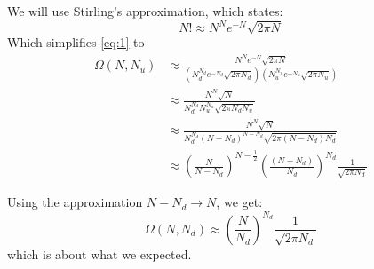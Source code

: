 \documentclass[paper=a4, fontsize=11pt]{scrartcl} %
\numberwithin{equation}{section} %
\numberwithin{figure}{section} %
\numberwithin{table}{section} %
\begin{document}
We will use Stirling's approximation, which states:
\[
    N! \approx N^Ne^{-N}\sqrt{2\pi N}
\]
Which simplifies \ref{eq:1} to
\begin{equation}
    \begin{aligned}
        \Omega(N, N_u) &\approx \frac{N^Ne^{-N}\sqrt{2\pi N}}
                                {(N_d^{N_d}e^{-N_d}\sqrt{2\pi N_d})(N_u^{N_u}e^{-N_u}\sqrt{2\pi N_u})}\\
                        &\approx \frac{N^N\sqrt{N}}{N_d^{N_d}N_u^{N_u}\sqrt{2\pi N_dN_u}}\\
                        &\approx \frac{N^N\sqrt{N}}{N_d^{N_d}(N-N_d)^{N-N_d}\sqrt{2\pi (N - N_d)N_d}}\\
                        &\approx \left (\frac{N}{N-N_d}\right )^{N-\frac{1}{2}} \left(\frac{(N-N_d)}{N_d}\right)^{N_d}\frac{1}{\sqrt{2\pi N_d}}
    \end{aligned}
\end{equation}

Using the approximation $N-N_d \to N$, we get:
\[
    \Omega(N, N_d) \approx \left(\frac{N}{N_d}\right)^{N_d}\frac{1}{\sqrt{2\pi N_d}}
\]
which is about what we expected.
\end{document}
